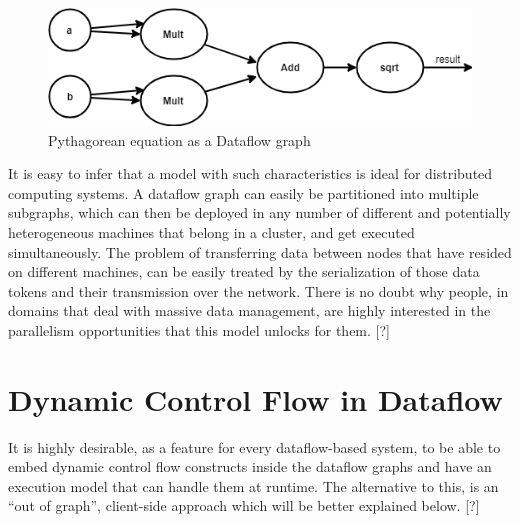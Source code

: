 \documentclass[ack,preface]{dithesis}
\begin{document}
\begin{figure}
\centering
\includegraphics[scale=0.8]{figures/dataflowExample}
\caption{ Pythagorean equation as a Dataflow graph}
\end{figure}

It is easy to infer that a model with such characteristics is ideal for distributed computing systems. A dataflow graph can easily be partitioned into multiple subgraphs, which can then be deployed in any number of different and potentially heterogeneous machines that belong in a cluster, and get executed simultaneously. The problem of transferring data between nodes that have resided on different machines, can be easily treated by the serialization of those data tokens and their transmission over the network.
There is no doubt why people, in domains that deal with massive data management, are highly interested in the parallelism opportunities that this model unlocks for them. [?] \\
\linebreak\linebreak\linebreak\linebreak\linebreak\linebreak


    \section{Dynamic Control Flow in Dataflow}
It is highly desirable, as a feature for every dataflow-based system, to be able to embed dynamic control flow constructs inside the dataflow graphs and have an execution model  that  can handle them at runtime. The alternative to this, is an “out of graph”, client-side approach which will be better explained below. [?]
\end{document}
